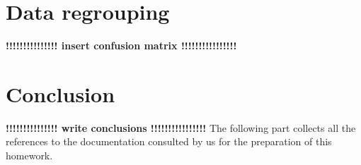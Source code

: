\documentclass{article}
\begin{document}
\section*{Data regrouping}
\textbf{ !!!!!!!!!!!!!!! insert confusion matrix !!!!!!!!!!!!!!!!}

\section*{Conclusion}
\textbf{ !!!!!!!!!!!!!!! write conclusions !!!!!!!!!!!!!!!!}
\newline
\newline
\newline
The following part collects all the references to the documentation consulted by us for the preparation of this homework.

\cite{urbansound}
\cite{crossvalidation}
\cite{librosa}
\cite{librosamfcc}
\cite{usc}
\cite{suplearning}
\cite{gmm}
\cite{dcase}
\cite{bad2}
\cite{bird}

\printbibliography
\end{document}
